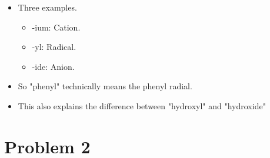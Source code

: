 \documentclass[../notes.tex]{subfiles}
\begin{document}
\begin{itemize}
\begin{itemize}
        \item Three examples.
        \begin{itemize}
            \item -ium: Cation.
            \item -yl: Radical.
            \item -ide: Anion.
        \end{itemize}
        \item So "phenyl" technically means the phenyl radial.
        \item This also explains the difference between "hydroxyl" and "hydroxide"
    \end{itemize}
\end{itemize}



\section{Problem 2}
\end{document}
